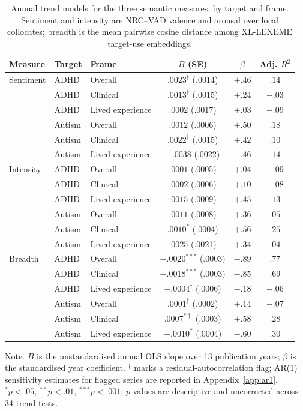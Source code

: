 \begin{table}[t!]
\caption{Annual trend models for the three semantic measures, by target and frame.
Sentiment and intensity are NRC--VAD valence and arousal over local collocates; breadth is
the mean pairwise cosine distance among XL-LEXEME target-use embeddings.}
\label{tab:trends}
\small
\begin{tabular}{@{}lllccc@{}}
\toprule
Measure & Target & Frame & $B$ (SE) & $\beta$ & Adj. $R^2$ \\
\midrule
Sentiment & ADHD & Overall & $.0023^{\dagger}$ (.0014) & $+.46$ & $.14$ \\
 & ADHD & Clinical & $.0013^{\dagger}$ (.0015) & $+.24$ & $-.03$ \\
 & ADHD & Lived experience & $.0002$ (.0017) & $+.03$ & $-.09$ \\
 & Autism & Overall & $.0012$ (.0006) & $+.50$ & $.18$ \\
 & Autism & Clinical & $.0022^{\dagger}$ (.0015) & $+.42$ & $.10$ \\
 & Autism & Lived experience & $-.0038$ (.0022) & $-.46$ & $.14$ \\
Intensity & ADHD & Overall & $.0001$ (.0005) & $+.04$ & $-.09$ \\
 & ADHD & Clinical & $.0002$ (.0006) & $+.10$ & $-.08$ \\
 & ADHD & Lived experience & $.0015$ (.0009) & $+.45$ & $.13$ \\
 & Autism & Overall & $.0011$ (.0008) & $+.36$ & $.05$ \\
 & Autism & Clinical & $.0010^{*}$ (.0004) & $+.56$ & $.25$ \\
 & Autism & Lived experience & $.0025$ (.0021) & $+.34$ & $.04$ \\
Breadth & ADHD & Overall & $-.0020^{***}$ (.0003) & $-.89$ & $.77$ \\
 & ADHD & Clinical & $-.0018^{***}$ (.0003) & $-.85$ & $.69$ \\
 & ADHD & Lived experience & $-.0004^{\dagger}$ (.0006) & $-.18$ & $-.06$ \\
 & Autism & Overall & $.0001^{\dagger}$ (.0002) & $+.14$ & $-.07$ \\
 & Autism & Clinical & $.0007^{*\dagger}$ (.0003) & $+.58$ & $.28$ \\
 & Autism & Lived experience & $-.0010^{*}$ (.0004) & $-.60$ & $.30$ \\
\bottomrule
\end{tabular}
\par\vspace{3pt}
\parbox{\linewidth}{\footnotesize Note. $B$ is the unstandardised annual OLS slope over 13
publication years; $\beta$ is the standardised year coefficient. $^{\dagger}$ marks a
residual-autocorrelation flag; AR(1) sensitivity estimates for flagged series are reported
in Appendix~\ref{app:ar1}. $^{*}p<.05$, $^{**}p<.01$, $^{***}p<.001$; $p$-values are
descriptive and uncorrected across 34 trend tests.}
\end{table}
